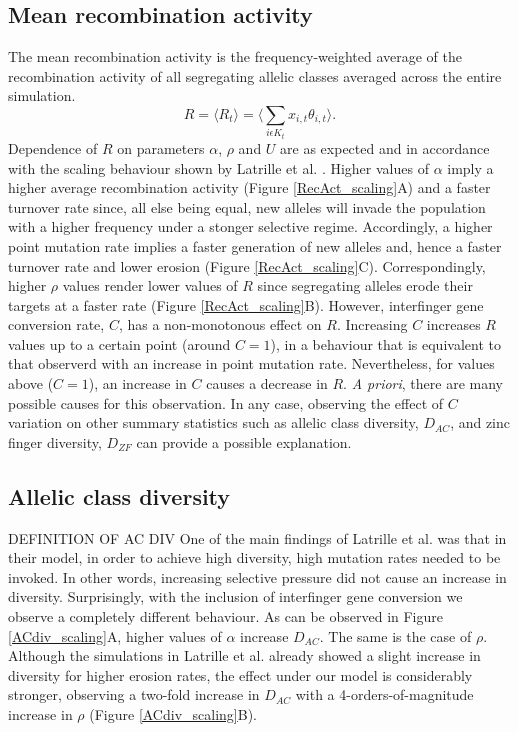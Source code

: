 \documentclass[a4paper,10pt]{article}
\begin{document}
\subsection{Mean recombination activity}
The mean recombination activity is the frequency-weighted average of the recombination activity of all segregating allelic classes averaged across the entire simulation. 
 \begin{equation}
 R =  \langle R_t \rangle = \bigg \langle \sum_{i \epsilon K_t} x_{i,t} \theta_{i,t} \bigg \rangle.
\end{equation}
Dependence of $R$ on parameters $\alpha$, $\rho$ and $U$ are as expected and in accordance with the scaling behaviour shown by Latrille et al. \cite{Latrille2017}. Higher values of $\alpha$ imply a higher average recombination activity (Figure \ref{RecAct_scaling}A) and a faster turnover rate since, all else being equal, new alleles will invade the population with a higher frequency under a stonger selective regime. Accordingly, a higher point mutation rate implies a faster generation of new alleles and, hence a faster turnover rate and lower erosion (Figure \ref{RecAct_scaling}C). Correspondingly, higher $\rho$ values render lower values of $R$ since segregating alleles erode their targets at a faster rate (Figure \ref{RecAct_scaling}B). However, interfinger gene conversion rate, $C$, has a non-monotonous effect on $R$. Increasing $C$ increases $R$ values up to a certain point (around $C = 1$), in a behaviour that is equivalent to that observerd with an increase in point mutation rate. Nevertheless, for values above ($C = 1$), an increase in $C$ causes a decrease in $R$. \textit{A priori}, there are many possible causes for this observation. In any case, observing the effect of $C$ variation on other summary statistics such as allelic class diversity, $D_{AC}$, and zinc finger diversity, $D_{ZF}$ can provide a possible explanation. 


\subsection{Allelic class diversity}
DEFINITION OF AC DIV
One of the main findings of Latrille et al. \cite{Latrille2017} was that in their model, in order to achieve high diversity, high mutation rates needed to be invoked. In other words, increasing selective pressure did not cause an increase in diversity. Surprisingly, with the inclusion of interfinger gene conversion we observe a completely different behaviour. As can be observed in Figure \ref{ACdiv_scaling}A, higher values of $\alpha$ increase $D_{AC}$. The same is the case of $\rho$. Although the simulations in Latrille et al. \cite{Latrille2017} already showed a slight increase in diversity for higher erosion rates, the effect under our model is considerably stronger, observing a two-fold increase in $D_{AC}$ with a 4-orders-of-magnitude increase in $\rho$ (Figure \ref{ACdiv_scaling}B).
\end{document}
